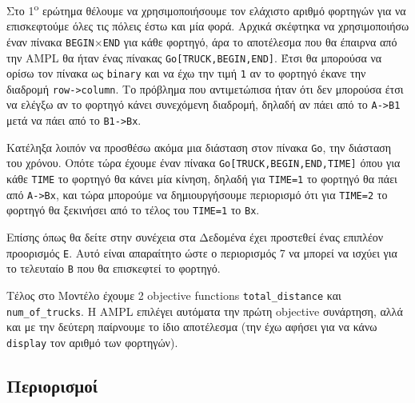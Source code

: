 \documentclass[
]{article}
\begin{document}
Στο 1\textsuperscript{o} ερώτημα θέλουμε να χρησιμοποιήσουμε τον ελάχιστο αριθμό
φορτηγών για να επισκεφτούμε όλες τις πόλεις έστω και μία φορά. Αρχικά
σκέφτηκα να χρησιμοποιήσω έναν πίνακα \texttt{BEGIN}\(\times\)\texttt{END} για κάθε φορτηγό,
άρα το αποτέλεσμα που θα έπαιρνα από την AMPL θα ήταν ένας πίνακας
\texttt{Go{[}TRUCK,BEGIN,END{]}}. Έτσι θα μπορούσα να ορίσω τον πίνακα ως \texttt{binary}
και να έχω την τιμή \texttt{1} αν το φορτηγό έκανε την διαδρομή \texttt{row-\textgreater{}column}.
Το πρόβλημα που αντιμετώπισα ήταν ότι δεν μπορούσα έτσι να ελέγξω αν το
φορτηγό κάνει συνεχόμενη διαδρομή, δηλαδή αν πάει από το \texttt{A-\textgreater{}B1} μετά να
πάει από το \texttt{B1-\textgreater{}Bx}.

Κατέληξα λοιπόν να προσθέσω ακόμα μια διάσταση στον πίνακα \texttt{Go}, την
διάσταση του χρόνου. Οπότε τώρα έχουμε έναν πίνακα
\texttt{Go{[}TRUCK,BEGIN,END,TIME{]}} όπου για κάθε \texttt{TIME} το φορτηγό θα κάνει μία
κίνηση, δηλαδή για \texttt{ΤΙΜΕ=1} το φορτηγό θα πάει από \texttt{A-\textgreater{}Bx}, και τώρα
μπορούμε να δημιουργήσουμε περιορισμό ότι για \texttt{TIME=2} το φορτηγό θα
ξεκινήσει από το τέλος του \texttt{ΤΙΜΕ=1} το \texttt{Bx}.

Επίσης όπως θα δείτε στην συνέχεια στα Δεδομένα έχει προστεθεί ένας επιπλέον
προορισμός \texttt{E}. Αυτό είναι απαραίτητο ώστε ο περιορισμός 7 να μπορεί να ισχύει
για το τελευταίο \texttt{Β} που θα επισκεφτεί το φορτηγό.

Τέλος στο Μοντέλο έχουμε 2 objective functions \texttt{total\_distance} και
\texttt{num\_of\_trucks}. Η AMPL επιλέγει αυτόματα την πρώτη objective συνάρτηση, αλλά
και με την δεύτερη παίρνουμε το ίδιο αποτέλεσμα (την έχω αφήσει για να κάνω
\texttt{display} τον αριθμό των φορτηγών).

\hypertarget{ux3c0ux3b5ux3c1ux3b9ux3bfux3c1ux3b9ux3c3ux3bcux3bfux3af}{%
\subsection{Περιορισμοί}\label{ux3c0ux3b5ux3c1ux3b9ux3bfux3c1ux3b9ux3c3ux3bcux3bfux3af}}
\end{document}
